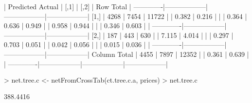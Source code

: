\documentclass{article}
\begin{document}
\begin{Schunk}
\begin{Soutput}
 
             | Predicted 
      Actual |             [,1] |             [,2] |        Row Total | 
-------------|------------------|------------------|------------------|
        [1,] |             4268 |             7454 |            11722 | 
             |            0.382 |            0.216 |                  | 
             |            0.364 |            0.636 |            0.949 | 
             |            0.958 |            0.944 |                  | 
             |            0.346 |            0.603 |                  | 
-------------|------------------|------------------|------------------|
        [2,] |              187 |              443 |              630 | 
             |            7.115 |            4.014 |                  | 
             |            0.297 |            0.703 |            0.051 | 
             |            0.042 |            0.056 |                  | 
             |            0.015 |            0.036 |                  | 
-------------|------------------|------------------|------------------|
Column Total |             4455 |             7897 |            12352 | 
             |            0.361 |            0.639 |                  | 
-------------|------------------|------------------|------------------|
\end{Soutput}
\begin{Sinput}
> net.tree.c <- netFromCrossTab(ct.tree.c.a, prices)
> net.tree.c
\end{Sinput}
\begin{Soutput}
[1] 388.4416
\end{Soutput}
\end{Schunk}
\end{document}
